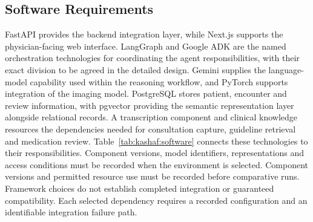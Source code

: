 
\subsection{Software Requirements}

FastAPI provides the backend integration layer, while Next.js supports the physician-facing web interface. LangGraph and Google ADK are the named orchestration technologies for coordinating the agent responsibilities, with their exact division to be agreed in the detailed design. Gemini supplies the language-model capability used within the reasoning workflow, and PyTorch supports integration of the imaging model. PostgreSQL stores patient, encounter and review information, with pgvector providing the semantic representation layer alongside relational records. A transcription component and clinical knowledge resources the dependencies needed for consultation capture, guideline retrieval and medication review. Table~\ref{tab:kashaf:software} connects these technologies to their responsibilities. Component versions, model identifiers, representations and access conditions must be recorded when the environment is selected. Component versions and permitted resource use must be recorded before comparative runs. Framework choices do not establish completed integration or guaranteed compatibility. Each selected dependency requires a recorded configuration and an identifiable integration failure path.

